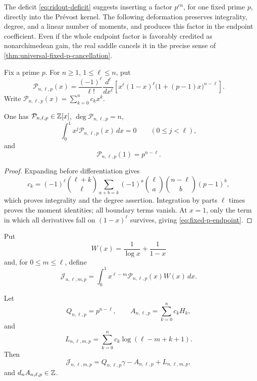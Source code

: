 The deficit \eqref{eq:ridout-deficit} suggests inserting a factor
\(p^{cn}\), for one fixed prime \(p\), directly into the Pr\'evost kernel.
The following deformation preserves integrality, degree, and a linear number
of moments, and produces this factor in the endpoint coefficient.  Even if
the whole endpoint factor is favorably credited as nonarchimedean gain, the
real saddle cancels it in the precise sense of
\cref{thm:universal-fixed-p-cancellation}.

Fix a prime \(p\).  For \(n\ge1\), \(1\le\ell\le n\), put
\begin{equation}\label{eq:fixed-p-rodrigues}
 \mathcal P_{n,\ell,p}(x)=
 \frac{(-1)^\ell}{\ell!}\frac{d^\ell}{dx^\ell}
 \left[x^\ell(1-x)^\ell
 \bigl(1+(p-1)x\bigr)^{n-\ell}\right].
\end{equation}
Write \(\mathcal P_{n,\ell,p}(x)=\sum_{k=0}^nc_kx^k\).

\begin{proposition}
\label{prop:fixed-p-arithmetic}
One has \(\mathcal P_{n,\ell,p}\in\mathbb Z[x]\),
\(\deg\mathcal P_{n,\ell,p}=n\),
\[
 \int_0^1x^j\mathcal P_{n,\ell,p}(x)\,dx=0
 \qquad(0\le j<\ell),
\]
and
\begin{equation}\label{eq:fixed-p-endpoint}
 \boxed{\mathcal P_{n,\ell,p}(1)=p^{n-\ell}.}
\end{equation}
\end{proposition}

\begin{proof}
Expanding before differentiation gives
\[
 c_k=(-1)^\ell\binom{\ell+k}{\ell}
 \sum_{a+b=k}(-1)^a
 \binom\ell a\binom{n-\ell}b(p-1)^b,
\]
which proves integrality and the degree assertion.  Integration by parts
\(\ell\) times proves the moment identities; all boundary terms vanish.
At \(x=1\), only the term in which all derivatives fall on
\((1-x)^\ell\) survives, giving \eqref{eq:fixed-p-endpoint}.
\end{proof}

Put
\[
 W(x)=\frac1{\log x}+\frac1{1-x}
\]
and, for \(0\le m\le\ell\), define
\begin{equation}\label{eq:fixed-p-moment}
 \mathcal J_{n,\ell,m,p}=
 \int_0^1x^{\ell-m}\mathcal P_{n,\ell,p}(x)W(x)\,dx.
\end{equation}

\begin{proposition}
\label{prop:fixed-p-linear-form}
Let
\[
 Q_{n,\ell,p}=p^{n-\ell},
 \qquad
 A_{n,\ell,p}=\sum_{k=0}^nc_kH_k,
\]
and
\[
 L_{n,\ell,m,p}=
 \sum_{k=0}^nc_k\log(\ell-m+k+1).
\]
Then
\begin{equation}\label{eq:fixed-p-exact-form}
 \boxed{\mathcal J_{n,\ell,m,p}
 =Q_{n,\ell,p}\gamma-A_{n,\ell,p}+L_{n,\ell,m,p},}
\end{equation}
and \(d_nA_{n,\ell,p}\in\mathbb Z\).
\end{proposition}

